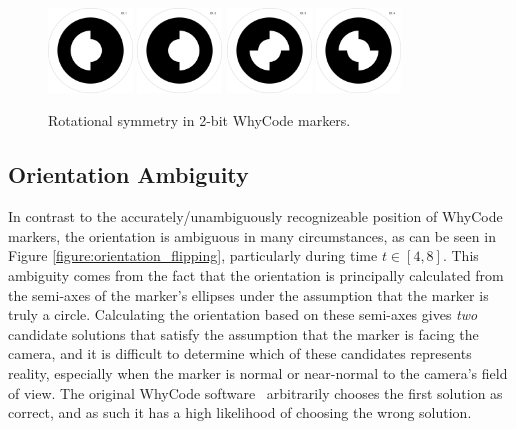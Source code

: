 \begin{figure}
    \centering
    \includegraphics[width=0.2\textwidth]{images/00000001.png}
    \includegraphics[width=0.2\textwidth]{images/00000002.png}
    \includegraphics[width=0.2\textwidth]{images/00000003.png}
    \includegraphics[width=0.2\textwidth]{images/00000004.png}
    \caption{Rotational symmetry in 2-bit WhyCode markers.}
    \label{fig:rotationally_symmetric_whycode_markers}
\end{figure}

\subsection{Orientation Ambiguity}

In contrast to the accurately/unambiguously recognizeable position of WhyCode markers, the orientation
is ambiguous in many circumstances, as can be seen in Figure \ref{figure:orientation_flipping},
particularly during time $t \in [4,8]$.
This ambiguity comes from the fact that the orientation is principally calculated from the semi-axes of the
marker's ellipses under the assumption that the marker is truly a circle.
Calculating the orientation based on these semi-axes gives \textit{two} candidate solutions
that satisfy the assumption that the marker is facing the camera,
and it is difficult to determine which of these candidates represents reality,
especially when the marker is normal or near-normal to the camera's field of view.
The original WhyCode software~\cite{LCAS_whycon} arbitrarily chooses the first solution as correct,
and as such it has a high likelihood of choosing the wrong solution.

